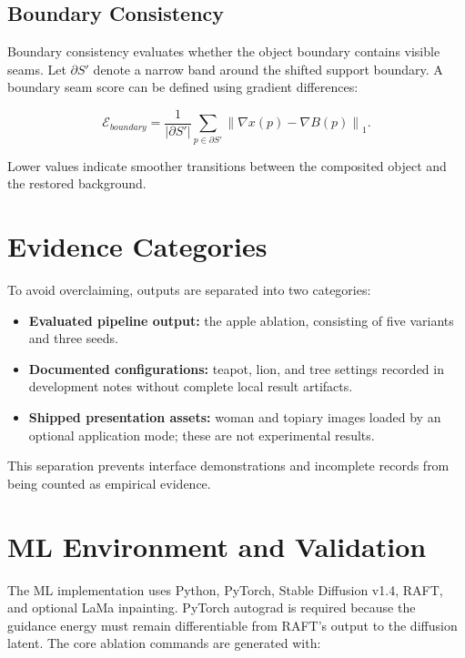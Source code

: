 \subsection{Boundary Consistency}

Boundary consistency evaluates whether the object boundary contains visible seams. Let $\partial S'$ denote a narrow band around the shifted support boundary. A boundary seam score can be defined using gradient differences:

\begin{equation}
\mathcal{E}_{boundary} =
\frac{1}{|\partial S'|}
\sum_{p \in \partial S'}
\left\|
\nabla x(p)-\nabla B(p)
\right\|_1.
\label{eq:boundary-score}
\end{equation}

Lower values indicate smoother transitions between the composited object and the restored background.

\section{Evidence Categories}

To avoid overclaiming, outputs are separated into two categories:

\begin{itemize}
  \item \textbf{Evaluated pipeline output:} the apple ablation, consisting of five variants and three seeds.
  \item \textbf{Documented configurations:} teapot, lion, and tree settings recorded in development notes without complete local result artifacts.
  \item \textbf{Shipped presentation assets:} woman and topiary images loaded by an optional application mode; these are not experimental results.
\end{itemize}

This separation prevents interface demonstrations and incomplete records from being counted as empirical evidence.

\section{ML Environment and Validation}

The ML implementation uses Python, PyTorch, Stable Diffusion v1.4, RAFT, and optional LaMa inpainting. PyTorch autograd is required because the guidance energy must remain differentiable from RAFT's output to the diffusion latent. The core ablation commands are generated with:

